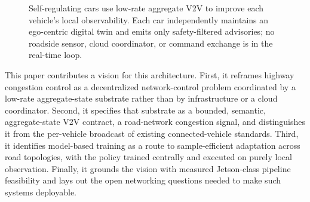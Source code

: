 \begin{figure}[t]
\centering
{}
\caption{Self-regulating cars use low-rate aggregate V2V to improve each vehicle's local observability. Each car independently maintains an ego-centric digital twin and emits only safety-filtered advisories; no roadside sensor, cloud coordinator, or command exchange is in the real-time loop.}
\label{fig:system-vision}
\vspace{-1 cm}
\end{figure}

This paper contributes a vision for this architecture. First, it reframes highway congestion control as a decentralized network-control problem coordinated by a low-rate aggregate-state substrate rather than by infrastructure or a cloud coordinator. Second, it specifies that substrate as a bounded, semantic, aggregate-state V2V contract, a road-network congestion signal, and distinguishes it from the per-vehicle broadcast of existing connected-vehicle standards. Third, it identifies model-based training as a route to sample-efficient adaptation across road topologies, with the policy trained centrally and executed on purely local observation. Finally, it grounds the vision with measured Jetson-class pipeline feasibility and lays out the open networking questions needed to make such systems deployable. 
